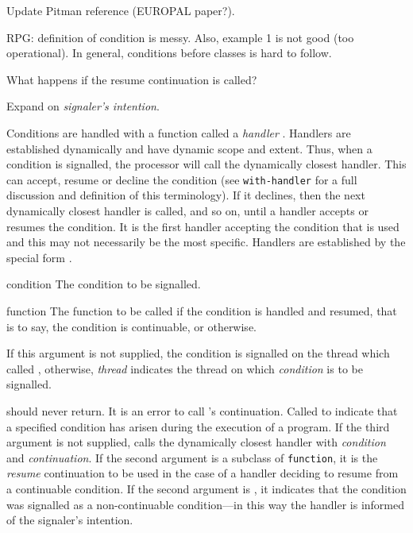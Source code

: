 \label{cond-hand}
%
\begin{optPrivate}
    Update Pitman reference (EUROPAL paper?).

    RPG: definition of condition is messy.  Also, example 1 is not good (too
    operational).  In general, conditions before classes is hard to follow.

    What happens if the resume continuation \nil{}\/ is called?

    Expand on {\em signaler's intention}.
\end{optPrivate}
%
\begin{optDefinition}
%
Conditions are handled with a function called a {\em handler}
.  Handlers are established dynamically and have
dynamic scope and extent.  Thus, when a condition is signalled, the processor
will call the dynamically closest handler.  This can accept, resume or decline
the condition (see {\tt with-handler} for a full discussion and definition of
this terminology).  If it declines, then the next dynamically closest handler is
called, and so on, until a handler accepts or resumes the condition.  It is the
first handler accepting the condition that is used and this may not necessarily
be the most specific.  Handlers are established by the special form
.

%
\begin{arguments}
    \item[condition] The condition to be signalled.

    \item[function] The function to be called if the condition is handled and
    resumed, that is to say, the condition is continuable, or \nil{}
    otherwise.

    \item[\optional{thread}] If this argument is not supplied, the condition is
    signalled on the thread which called , otherwise, {\em
        thread} indicates the thread on which {\em condition} is to be
    signalled.
\end{arguments}
%
\result%
 should never return.  It is an error to call
's continuation.
%
\remarks%
Called to indicate that a specified condition has arisen during the execution of
a program.
%
If the third argument is not supplied,  calls the
dynamically closest handler with {\em condition} and {\em continuation}.  If the
second argument is a subclass of {\tt function}, it is the {\em resume}
continuation to be used in the case of a handler deciding to resume from a
continuable condition.  If the second argument is \nil{}, it indicates that the
condition was signalled as a non-continuable condition---in this way the handler
is informed of the signaler's intention.


\end{optDefinition}
